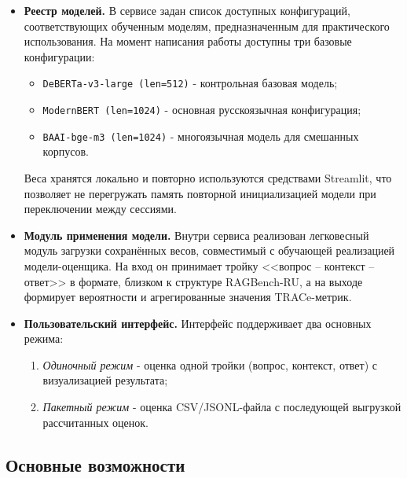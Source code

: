 \begin{itemize}
  \item \textbf{Реестр моделей.}
  В сервисе задан список доступных конфигураций, соответствующих обученным моделям,
  предназначенным для практического использования. На момент написания работы доступны
  три базовые конфигурации:
    \begin{itemize}
      \item \texttt{DeBERTa-v3-large (len=512)} - контрольная базовая модель;
      \item \texttt{ModernBERT (len=1024)} - основная русскоязычная конфигурация;
      \item \texttt{BAAI-bge-m3 (len=1024)} - многоязычная модель для смешанных корпусов.
    \end{itemize}
  Веса хранятся локально и повторно используются средствами Streamlit, что позволяет не
  перегружать память повторной инициализацией модели при переключении между сессиями.

  \item \textbf{Модуль применения модели.}
  Внутри сервиса реализован легковесный модуль загрузки сохранённых весов, совместимый с
  обучающей реализацией модели-оценщика. На вход он принимает тройку
  <<вопрос -- контекст -- ответ>> в формате, близком к структуре RAGBench-RU, а на
  выходе формирует вероятности и агрегированные значения TRACe-метрик.

  \item \textbf{Пользовательский интерфейс.}
  Интерфейс поддерживает два основных режима:
    \begin{enumerate}
      \item \emph{Одиночный режим} - оценка одной тройки
      (вопрос, контекст, ответ) с визуализацией результата;
      \item \emph{Пакетный режим} - оценка CSV/JSONL-файла с последующей выгрузкой
      рассчитанных оценок.
    \end{enumerate}
\end{itemize}

\subsection{Основные возможности}

